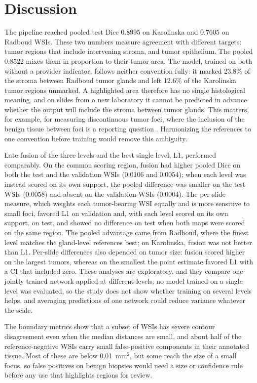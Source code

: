 \documentclass[10pt,letterpaper]{article}
\begin{document}
\section*{Discussion}
The pipeline reached pooled test Dice 0.8995 on Karolinska and 0.7605 on Radboud WSIs. These two numbers measure agreement with different targets: tumor regions that include intervening stroma, and tumor epithelium. The pooled 0.8522 mixes them in proportion to their tumor area. The model, trained on both without a provider indicator, follows neither convention fully: it marked 23.8\% of the stroma between Radboud tumor glands and left 12.6\% of the Karolinska tumor regions unmarked. A highlighted area therefore has no single histological meaning, and on slides from a new laboratory it cannot be predicted in advance whether the output will include the stroma between tumor glands. This matters, for example, for measuring discontinuous tumor foci, where the inclusion of the benign tissue between foci is a reporting question \cite{bibKarram}. Harmonizing the references to one convention before training would remove this ambiguity.

Late fusion of the three levels and the best single level, L1, performed comparably. On the common scoring region, fusion had higher pooled Dice on both the test and the validation WSIs (0.0106 and 0.0054); when each level was instead scored on its own support, the pooled difference was smaller on the test WSIs (0.0058) and absent on the validation WSIs (0.0004). The per-slide measure, which weights each tumor-bearing WSI equally and is more sensitive to small foci, favored L1 on validation and, with each level scored on its own support, on test, and showed no difference on test when both maps were scored on the same region. The pooled advantage came from Radboud, where the finest level matches the gland-level references best; on Karolinska, fusion was not better than L1. Per-slide differences also depended on tumor size: fusion scored higher on the largest tumors, whereas on the smallest the point estimate favored L1 with a CI that included zero. These analyses are exploratory, and they compare one jointly trained network applied at different levels; no model trained on a single level was evaluated, so the study does not show whether training on several levels helps, and averaging predictions of one network could reduce variance whatever the scale.

The boundary metrics show that a subset of WSIs has severe contour disagreement even when the median distances are small, and about half of the reference-negative WSIs carry small false-positive components in their annotated tissue. Most of these are below 0.01~mm$^2$, but some reach the size of a small focus, so false positives on benign biopsies would need a size or confidence rule before any use that highlights regions for review.
\end{document}
